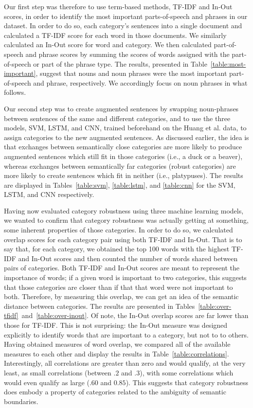 \documentclass[letterpaper, 12 pt, conference]{ieeeconf}
\begin{document}
Our first step was therefore to use term-based methods, TF-IDF and In-Out scores, in order to identify the most important parts-of-speech and phrases in our dataset. In order to do so, each category's sentences into a single document and calculated a TF-IDF score for each word in those documents. We similarly calculated an In-Out score for word and category. We then calculated part-of-speech and phrase scores by summing the scores of words assigned with the part-of-speech or part of the phrase type. The results, presented in Table~\ref{table:most-important}, suggest that nouns and noun phrases were the most important part-of-speech and phrase, respectively. We accordingly focus on noun phrases in what follows.

Our second step was to create augmented sentences by swapping noun-phrases between sentences of the same and different categories, and to use the three models, SVM, LSTM, and CNN, trained beforehand on the Huang et al. \cite{huang:aim:2018} data, to assign categories to the new augmented sentences. As discussed earlier, the idea is that exchanges between semantically close categories are more likely to produce augmented sentences which still fit in those categories (i.e., a duck or a beaver), whereas exchanges between semantically far categories (robust categories) are more likely to create sentences which fit in neither (i.e., platypuses). The results are displayed in Tables~\ref{table:svm}, \ref{table:lstm}, and \ref{table:cnn} for the SVM, LSTM, and CNN respectively.


Having now evaluated category robustness using three machine learning models, we wanted to confirm that category robustness was actually getting at something, some inherent properties of those categories. In order to do so, we calculated overlap scores for each category pair using both TF-IDF and In-Out. That is to say that, for each category, we obtained the top 100 words with the highest TF-IDF and In-Out scores and then counted the number of words shared between pairs of categories. Both TF-IDF and In-Out scores are meant to represent the importance of words; if a given word is important to two categories, this suggests that those categories are closer than if that that word were not important to both. Therefore, by measuring this overlap, we can get an idea of the semantic distance between categories. The results are presented in Tables~\ref{table:over-tfidf}~and~\ref{table:over-inout}. Of note, the In-Out overlap scores are far lower than those for TF-IDF. This is not surprising: the In-Out measure was designed explicitly to identify words that are important to a category, but not to to others. Having obtained measures of word overlap, we compared all of the available measures to each other and display the results in Table~\ref{table:correlations}. Interestingly, all correlations are greater than zero and would qualify, at the very least, as small correlations (between $.2$ and $.3$), with some correlations which would even qualify as large ($.60$ and $0.85$). This suggests that category robustness does embody a property of categories related to the ambiguity of semantic boundaries.
\end{document}
